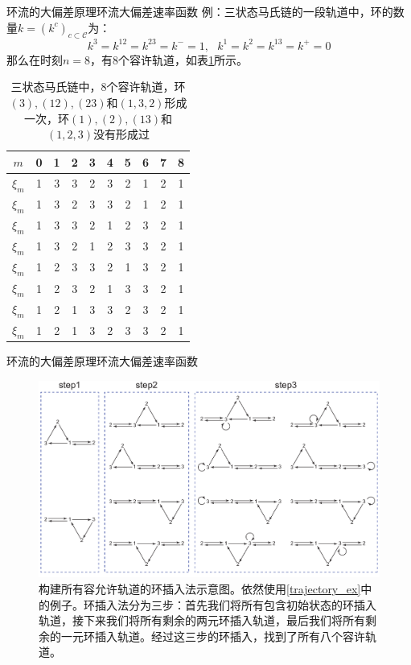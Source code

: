 \documentclass{beamer}
\begin{document}
\begin{frame}{环流的大偏差原理}{环流大偏差速率函数}
	例：三状态马氏链的一段轨道中，环的数量$k=(k^c)_{c\subset \mathcal{C}}$为：
	\begin{equation*} \label{trajectory_ex}
		k^3 = k^{12} = k^{23} = k^- = 1, ~~~ k^1 = k^2 = k^{13} = k^+= 0
	\end{equation*}
	那么在时刻$n=8$，有8个容许轨道，如表\ref{table:all possible trajectories}所示。

	\begin{table}[htb!]
		\renewcommand\arraystretch{0.8}
		\begin{tabular}{cccccccccc}
			\hline
			$m$     & 0 & 1 & 2 & 3 & 4 & 5 & 6 & 7 & 8 \\\hline
			$\xi_m$ & 1 & 3 & 3 & 2 & 3 & 2 & 1 & 2 & 1 \\\hline
			$\xi_m$ & 1 & 3 & 2 & 3 & 3 & 2 & 1 & 2 & 1 \\\hline
			$\xi_m$ & 1 & 3 & 3 & 2 & 1 & 2 & 3 & 2 & 1 \\\hline
			$\xi_m$ & 1 & 3 & 2 & 1 & 2 & 3 & 3 & 2 & 1 \\\hline
			$\xi_m$ & 1 & 2 & 3 & 3 & 2 & 1 & 3 & 2 & 1 \\\hline
			$\xi_m$ & 1 & 2 & 3 & 2 & 1 & 3 & 3 & 2 & 1 \\\hline
			$\xi_m$ & 1 & 2 & 1 & 3 & 3 & 2 & 3 & 2 & 1 \\\hline
			$\xi_m$ & 1 & 2 & 1 & 3 & 2 & 3 & 3 & 2 & 1 \\\hline
		\end{tabular}\centering
		\caption{三状态马氏链中，8个容许轨道，环$(3), (12), (23)$和$(1,3,2)$形成一次，环$(1), (2), (13)$和$(1,2,3)$没有形成过}
		\label{table:all possible trajectories}
	\end{table}
\end{frame}

\begin{frame}{环流的大偏差原理}{环流大偏差速率函数}
	\begin{figure}[htb!]
		\centering
		\includegraphics[scale=0.35]{chart/insertiongraph.pdf}
		\caption{{\tiny 构建所有容允许轨道的环插入法示意图。依然使用\ref{trajectory_ex}中的例子。环插入法分为三步：首先我们将所有包含初始状态的环插入轨道，接下来我们将所有剩余的两元环插入轨道，最后我们将所有剩余的一元环插入轨道。经过这三步的环插入，找到了所有八个容许轨道。}}
		\label{figure:insertion}
	\end{figure}
\end{frame}
\end{document}

